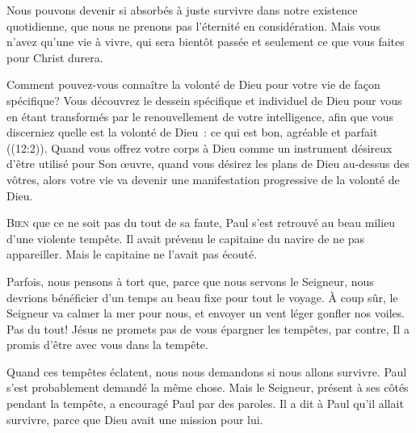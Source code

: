 
Nous pouvons devenir si absorbés à juste survivre dans notre existence
 quotidienne, que nous ne prenons pas l'éternité en considération.
 Mais vous n'avez qu'une vie à vivre, qui sera bientôt passée
 et seulement ce que vous faites pour Christ durera.

Comment pouvez-vous connaître la volonté de Dieu pour votre vie
 de fa\c{c}on spécifique? Vous découvrez le dessein spécifique et individuel
 de Dieu pour vous en étant \Og transformés par le renouvellement
 de votre intelligence, afin que vous discerniez quelle est la volonté de Dieu~:
 ce qui est bon, agréable et parfait \Fg{} ((12:2)).
 Quand vous offrez votre corps à Dieu comme un instrument désireux
 d'être utilisé pour Son \oe{}uvre, quand vous désirez les plans de Dieu
 au-dessus des vôtres, alors votre vie va devenir une manifestation
 progressive de la volonté de Dieu.


\dvrule






\lettrine{B}{ien} que ce ne soit pas du tout de sa faute,
 Paul s'est retrouvé au beau milieu d'une violente tempête.
 Il avait prévenu le capitaine du navire de ne pas appareiller.
 Mais le capitaine ne l'avait pas écouté.

Parfois, nous pensons à tort que, parce que nous servons le Seigneur,
 nous devrions bénéficier d'un temps au beau fixe pour tout le voyage.
 À coup sûr, le Seigneur va calmer la mer pour nous,
 et envoyer un vent léger gonfler nos voiles. Pas du tout!
 Jésus ne promets pas de vous épargner les tempêtes, par contre,
 Il a promis d'être avec vous dans la tempête.


Quand ces tempêtes éclatent, nous nous demandons si nous allons survivre.
 Paul s'est probablement demandé la même chose.
 Mais le Seigneur, présent à ses côtés pendant la tempête,
 a encouragé Paul par des paroles. Il a dit à Paul qu'il allait survivre,
 parce que Dieu avait une mission pour lui.

